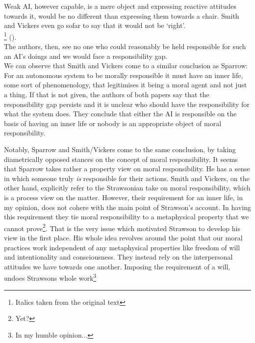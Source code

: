 \documentclass{article}
\begin{document}
Weak AI, however capable, is a mere object and expressing reactive attitudes
towards it, would be no different than expressing them towards a chair. Smith
and Vickers even go sofar to say that it would not be `right'.\\

\footnote{Italics
taken from the original text} (\cite[p. 4-5]{SmithVickers2021}).\\

The authors,
then, see no one who could reasonably be held responsible for such an AI's doings
and we would face a responsibility gap.\\

We can observe that Smith and Vickers come to a similar conclusion as Sparrow:
For an autonomous system to be morally responsible it must have an inner life,
some sort of phenomenology, that legitimises it being a moral agent and not just
a thing. If that is not given, the authors of both papers say that the
responsibility gap persists and it is unclear who should have the responsibility
for what the system does. They conclude that either the AI is responsible on the
basis of having an inner life or nobody is an appropriate object of moral
responsibility.

Notably, Sparrow and Smith/Vickers come to the same conclusion, by taking
diametrically opposed stances on the concept of moral responsibility. It seems
that Sparrow takes rather a property view on moral responsibility. He has a
sense in which someone truly \textit{is} responsible for their actions. Smith
and Vickers, on the other hand, explicitly refer to the Strawsonian take on
moral responsibility, which is a process view on the matter. However, their
requirement for an inner life, in my opinion, does not cohere with the main point
of Strawson's account. In having this requirement they tie moral responsibility
to a metaphysical property that we cannot prove\footnote{Yet?}. That is the very
issue which motivated Strawson to develop his view in the first place. His whole
idea revolves around the point that our moral practices work independent of any
metaphysical properties like freedom of will and intentionality and
consciousness. They instead rely on the interpersonal attitudes we have towards
one another. Imposing the requirement of a will, undoes Strawsons whole
work\footnote{In my humble opinion...}
\end{document}
